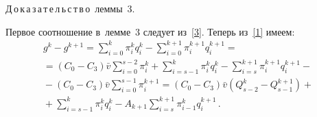 \begin{multicols}{2}
{\noindent
Д\,о\,к\,а\,з\,а\,т\,е\,л\,ь\,с\,т\,в\,о\ леммы~3.

Первое соотношение в~лемме~3 следует из~\eqref{3}. Теперь из~\eqref{1} имеем:
\begin{multline*}
g^k-g^{k+1}=\sum\limits_{i=0}^{k}\pi_i^{k}q_i^{k}-
\sum\limits_{i=0}^{k+1}\pi_i^{k+1}q_i^{k+1}={}\\
{}=
\left(C_0-C_3\right)\bar{v}\sum\limits_{i=0}^{s-2}\pi_i^k+
\sum\limits_{i=s-1}^{k}\pi_i^kq_i^k
-\sum\limits_{i=s}^{k+1}\pi_i^{k+1}q_i^{k+1}-{}
\\
{}-\left(C_0-C_3\right)\bar{v}\sum\limits_{i=0}^{s-1}
\pi_i^{k+1}=\left(C_0-C_3\right)\bar{v}\left(Q_{s-2}^k-Q_{s-1}^{k+1}\right)+{}\\
{}+
\sum\limits_{i=s-1}^{k}\pi_i^kq_i^k-A_{k+1}
\sum\limits_{i=s}^{k+1}\pi_{i-1}^kq_i^{k+1}\,.
\end{multline*}

}
\end{multicols}
